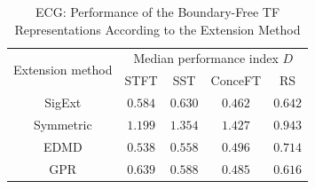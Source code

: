 \documentclass[journal,onecolumn]{IEEEtran}
\begin{document}
\begin{table}
\centering
\caption{ECG: Performance of the Boundary-Free TF Representations According to the Extension Method}
\begin{tabular}{|c||c|c|c|c|}
  \hline
   \multirow{2}{40pt}{\centering Extension method} & \multicolumn{4}{c|}{Median performance index $D$} \\
   \cline{2-5}
      & STFT & SST & ConceFT & RS\\
   \hhline{|=#=|=|=|=|}
   {\sf SigExt} & $0.584$ & $0.630$ & $0.462$ & $0.642$ \\
   \hline
   Symmetric & $1.199$ & $1.354$ & $1.427$ & $0.943$ \\
   \hline
   EDMD & $0.538$ & $0.558$ & $0.496$ & $0.714$ \\
   \hline
   GPR & $0.639$ & $0.588$ & $0.485$ & $0.616$ \\
   \hline
\end{tabular}
\label{tab:otd.ecg}
\end{table}
\end{document}
